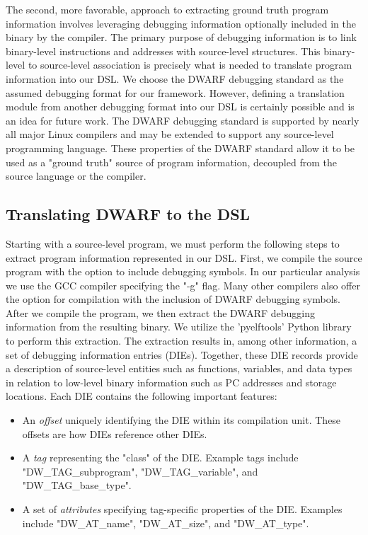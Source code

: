 The second, more favorable, approach to extracting ground truth program information involves leveraging debugging information optionally included in the binary by the compiler. The primary purpose of debugging information is to link binary-level instructions and addresses with source-level structures. This binary-level to source-level association is precisely what is needed to translate program information into our DSL. We choose the DWARF debugging standard as the assumed debugging format for our framework. However, defining a translation module from another debugging format into our DSL is certainly possible and is an idea for future work. The DWARF debugging standard is supported by nearly all major Linux compilers and may be extended to support any source-level programming language. These properties of the DWARF standard allow it to be used as a "ground truth" source of program information, decoupled from the source language or the compiler.

\subsection{Translating DWARF to the DSL}

Starting with a source-level program, we must perform the following steps to extract program information represented in our DSL. First, we compile the source program with the option to include debugging symbols. In our particular analysis we use the GCC compiler specifying the "-g" flag. Many other compilers also offer the option for compilation with the inclusion of DWARF debugging symbols. After we compile the program, we then extract the DWARF debugging information from the resulting binary. We utilize the 'pyelftools' Python library \cite{bib:pyelftools} to perform this extraction. The extraction results in, among other information, a set of debugging information entries (DIEs). Together, these DIE records provide a description of source-level entities such as functions, variables, and data types in relation to low-level binary information such as PC addresses and storage locations. Each DIE contains the following important features:

\begin{itemize}
    \item An \emph{offset} uniquely identifying the DIE within its compilation unit. These offsets are how DIEs reference other DIEs.
    \item A \emph{tag} representing the "class" of the DIE. Example tags include "DW\_TAG\_subprogram", "DW\_TAG\_variable", and "DW\_TAG\_base\_type".
    \item A set of \emph{attributes} specifying tag-specific properties of the DIE. Examples include "DW\_AT\_name", "DW\_AT\_size", and "DW\_AT\_type".
\end{itemize}

